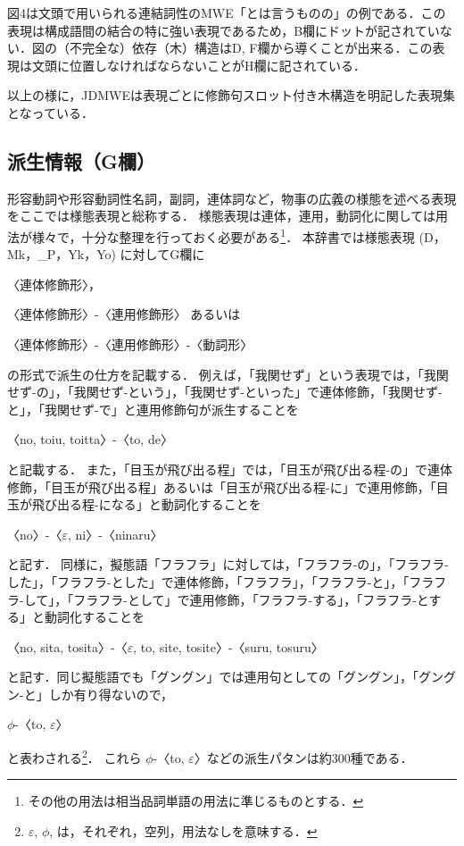 \documentclass[japanese]{jnlp_1.4}
\begin{document}
図4は文頭で用いられる連結詞性のMWE「とは言うものの」の例である．この表現は構成語間の結合の特に強い表現であるため，B欄にドットが記されていない．図の（不完全な）依存（木）構造はD, F欄から導くことが出来る．この表現は文頭に位置しなければならないことがH欄に記されている．

以上の様に，JDMWEは表現ごとに修飾句スロット付き木構造を明記した表現集となっている．


\subsection{派生情報\protect\normalsize{（G欄）}}

形容動詞や形容動詞性名詞，副詞，連体詞など，物事の広義の様態を述べる表現をここでは様態表現と総称する．
様態表現は連体，連用，動詞化に関しては用法が様々で，十分な整理を行っておく必要がある\footnote{その他の用法は相当品詞単語の用法に準じるものとする．}．  
本辞書では様態表現 (D，Mk，\_P，Yk，Yo) に対してG欄に

〈連体修飾形〉，

〈連体修飾形〉\<-\<〈連用修飾形〉 あるいは

〈連体修飾形〉\<-\<〈連用修飾形〉\<-\<〈動詞形〉

\noindent の形式で派生の仕方を記載する．
例えば，「我関せず」という表現では，「我関せず-の」，「我関せず-という」，「我関せず-といった」で連体修飾，「我関せず-と」，「我関せず-で」と連用修飾句が派生することを

〈no, toiu, toitta〉\<-\<〈to, de〉

\noindent と記載する． また，「目玉が飛び出る程」では，「目玉が飛び出る程-の」で連体修飾，「目玉が飛び出る程」あるいは「目玉が飛び出る程-に」で連用修飾，「目玉が飛び出る程-になる」と動詞化することを

〈no〉\<-\<〈$\varepsilon$, ni〉\<-\<〈ninaru〉

\noindent と記す．
同様に，擬態語「フラフラ」に対しては，「フラフラ-の」，「フラフラ-した」，「フラフラ-とした」で連体修飾，「フラフラ」，「フラフラ-と」，「フラフラ-して」，「フラフラ-として」で連用修飾，「フラフラ-する」，「フラフラ-とする」と動詞化することを

〈no, sita, tosita〉\<-\<〈$\varepsilon$, to, site, tosite〉\<-\<〈suru, tosuru〉

\noindent と記す．同じ擬態語でも「グングン」では連用句としての「グングン」，「グングン-と」しか有り得ないので，

$\phi$-\<〈to, $\varepsilon$〉

\noindent と表わされる\footnote{$\varepsilon$, $\phi$, は，それぞれ，空列，用法なしを意味する．}． 
これら $\phi$-\<〈to, $\varepsilon$〉などの派生パタンは約300種である．
\end{document}
